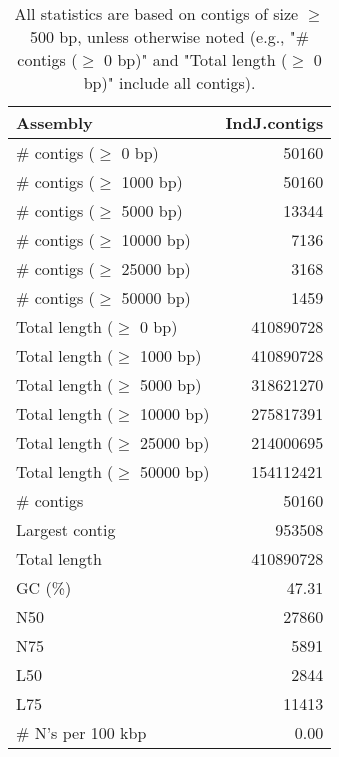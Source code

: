 \documentclass[12pt,a4paper]{article}
\begin{document}
\begin{table}[ht]
\begin{center}
\caption{All statistics are based on contigs of size $\geq$ 500 bp, unless otherwise noted (e.g., "\# contigs ($\geq$ 0 bp)" and "Total length ($\geq$ 0 bp)" include all contigs).}
\begin{tabular}{|l*{1}{|r}|}
\hline
Assembly & IndJ.contigs \\ \hline
\# contigs ($\geq$ 0 bp) & 50160 \\ \hline
\# contigs ($\geq$ 1000 bp) & 50160 \\ \hline
\# contigs ($\geq$ 5000 bp) & 13344 \\ \hline
\# contigs ($\geq$ 10000 bp) & 7136 \\ \hline
\# contigs ($\geq$ 25000 bp) & 3168 \\ \hline
\# contigs ($\geq$ 50000 bp) & 1459 \\ \hline
Total length ($\geq$ 0 bp) & 410890728 \\ \hline
Total length ($\geq$ 1000 bp) & 410890728 \\ \hline
Total length ($\geq$ 5000 bp) & 318621270 \\ \hline
Total length ($\geq$ 10000 bp) & 275817391 \\ \hline
Total length ($\geq$ 25000 bp) & 214000695 \\ \hline
Total length ($\geq$ 50000 bp) & 154112421 \\ \hline
\# contigs & 50160 \\ \hline
Largest contig & 953508 \\ \hline
Total length & 410890728 \\ \hline
GC (\%) & 47.31 \\ \hline
N50 & 27860 \\ \hline
N75 & 5891 \\ \hline
L50 & 2844 \\ \hline
L75 & 11413 \\ \hline
\# N's per 100 kbp & 0.00 \\ \hline
\end{tabular}
\end{center}
\end{table}
\end{document}
